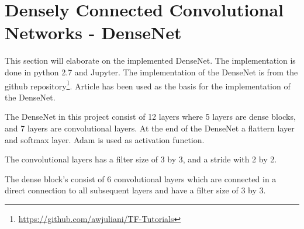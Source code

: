 \section{Densely Connected Convolutional Networks - DenseNet}

This section will elaborate on the implemented DenseNet. The implementation is done in python 2.7 and Jupyter. The implementation of the DenseNet is from the github repository\footnote{\url{https://github.com/awjuliani/TF-Tutorials}}. Article \citep{DENSE} has been used as the basis for the implementation of the DenseNet.

The DenseNet in this project consist of 12 layers where 5 layers are dense blocks, and 7 layers are convolutional layers. At the end of the DenseNet a flattern layer and softmax layer. Adam is used as activation function.

The convolutional layers has a filter size of 3 by 3, and a stride with 2 by 2. 

The dense block's consist of 6 convolutional layers which are connected in a direct connection to all subsequent layers and have a filter size of 3 by 3.